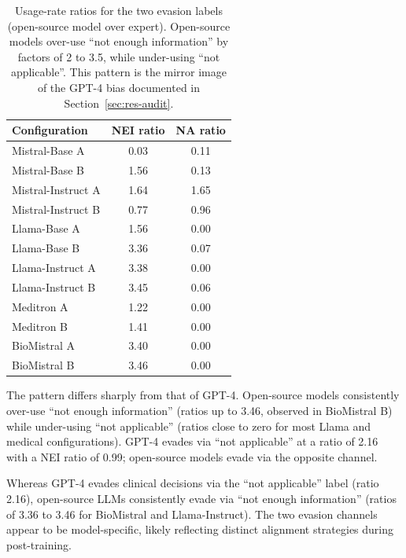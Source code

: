 \begin{table}[htbp]
    \centering
    \caption{Usage-rate ratios for the two evasion labels 
        (open-source model over expert). Open-source models over-use 
        ``not enough information'' by factors of 2 to 3.5, while 
        under-using ``not applicable''. This pattern is the mirror image 
        of the GPT-4 bias documented in Section~\ref{sec:res-audit}.}
    \label{tab:res-evasion}
    \small
    \begin{tabular}{@{}lcc@{}}
        \toprule
        \textbf{Configuration} & 
        \textbf{NEI ratio} & 
        \textbf{NA ratio} \\
        \midrule
        Mistral-Base A     & 0.03 & 0.11 \\
        Mistral-Base B     & 1.56 & 0.13 \\
        Mistral-Instruct A & 1.64 & 1.65 \\
        Mistral-Instruct B & 0.77 & 0.96 \\
        Llama-Base A       & 1.56 & 0.00 \\
        Llama-Base B       & 3.36 & 0.07 \\
        Llama-Instruct A   & 3.38 & 0.00 \\
        Llama-Instruct B   & 3.45 & 0.06 \\
        Meditron A         & 1.22 & 0.00 \\
        Meditron B         & 1.41 & 0.00 \\
        BioMistral A       & 3.40 & 0.00 \\
        BioMistral B       & 3.46 & 0.00 \\
        \bottomrule
    \end{tabular}
\end{table}

The pattern differs sharply from that of GPT-4. Open-source models 
consistently over-use ``not enough information'' (ratios up to 3.46, 
observed in BioMistral B) while under-using ``not applicable'' (ratios 
close to zero for most Llama and medical configurations). GPT-4 evades 
via ``not applicable'' at a ratio of 2.16 with a NEI ratio of 0.99; 
open-source models evade via the opposite channel.

\begin{finding}
    Whereas GPT-4 evades clinical decisions via the ``not applicable'' 
    label (ratio 2.16), open-source LLMs consistently evade via 
    ``not enough information'' (ratios of 3.36 to 3.46 for BioMistral 
    and Llama-Instruct). The two evasion channels appear to be 
    model-specific, likely reflecting distinct alignment strategies 
    during post-training.
\end{finding}


